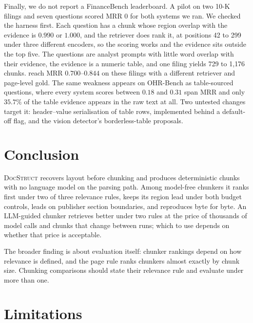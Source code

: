 \documentclass[11pt]{article}
\newcommand{\ds}{\textsc{DocStruct}}
\begin{document}
Finally, we do not report a FinanceBench leaderboard.
\label{sec:financebench}
A pilot on two 10-K filings and seven questions scored MRR $0$ for both systems we ran. We checked the harness first. Each question has a chunk whose region overlap with the evidence is $0.990$ or $1.000$, and the retriever does rank it, at positions 42 to 299 under three different encoders, so the scoring works and the evidence sits outside the top five. The questions are analyst prompts with little word overlap with their evidence, the evidence is a numeric table, and one filing yields 729 to 1{,}176 chunks. \citet{elbachyr2026empirical} reach MRR $0.700$--$0.844$ on these filings with a different retriever and page-level gold. The same weakness appears on OHR-Bench as table-sourced questions, where every system scores between $0.18$ and $0.31$ span MRR and only $35.7\%$ of the table evidence appears in the raw text at all. Two untested changes target it: header--value serialisation of table rows, implemented behind a default-off flag, and the vision detector's borderless-table proposals.

\section{Conclusion}
\label{sec:conclusion}

\ds{} recovers layout before chunking and produces deterministic chunks with no language model on the parsing path. Among model-free chunkers it ranks first under two of three relevance rules, keeps its region lead under both budget controls, leads on publisher section boundaries, and reproduces byte for byte. An LLM-guided chunker retrieves better under two rules at the price of thousands of model calls and chunks that change between runs; which to use depends on whether that price is acceptable.

The broader finding is about evaluation itself: chunker rankings depend on how relevance is defined, and the page rule ranks chunkers almost exactly by chunk size. Chunking comparisons should state their relevance rule and evaluate under more than one.

\section*{Limitations}
\label{sec:limitations}
\end{document}

